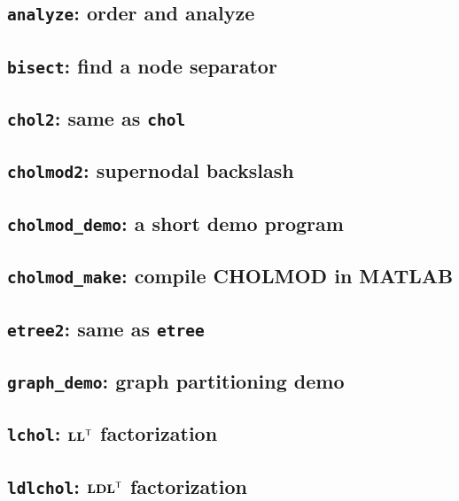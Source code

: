 \documentclass[11pt]{article}
\newcommand{\m}[1]{{\bf{#1}}}       %
\newcommand{\tr}{^{\sf T}}          %
\begin{document}
\subsection{{\tt analyze}: order and analyze}


\subsection{{\tt bisect}: find a node separator}


\subsection{{\tt chol2}: same as {\tt chol}}


\subsection{{\tt cholmod2}: supernodal backslash}


\subsection{{\tt cholmod\_demo}: a short demo program}


\subsection{{\tt cholmod\_make}: compile CHOLMOD in MATLAB}


\subsection{{\tt etree2}: same as {\tt etree}}


\subsection{{\tt graph\_demo}: graph partitioning demo}


\subsection{{\tt lchol}: $\m{LL}\tr$ factorization}


\subsection{{\tt ldlchol}: $\m{LDL}\tr$ factorization}

\end{document}
